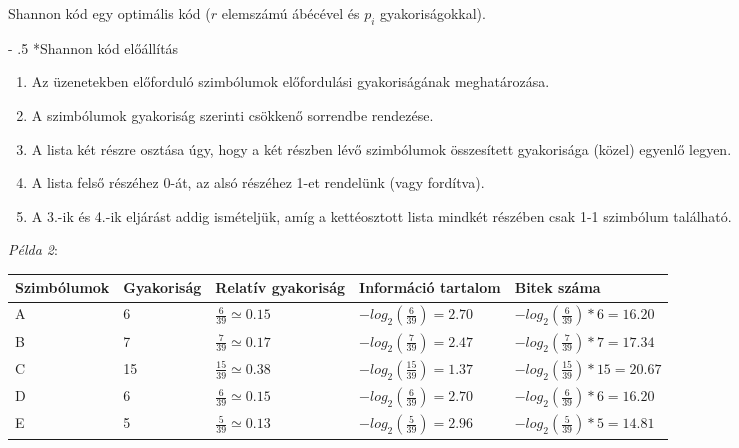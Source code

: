\documentclass[12pt,margin=0px]{article}
\makeatletter
\newcommand\ddfrac[2]{\frac{\displaystyle #1}{\displaystyle #2}}
\renewcommand\paragraph{%
	\@startsection{paragraph}{4}{0mm}%
	{-\baselineskip}%
	{.5\baselineskip}%
	{\normalfont\normalsize\bfseries}}
\makeatother
\begin{document}
    Shannon kód egy optimális kód ($r$ elemszámú ábécével és $p_i$ gyakoriságokkal).

    \paragraph*{Shannon kód előállítás}

    \begin{enumerate}
      \item Az üzenetekben előforduló szimbólumok előfordulási gyakoriságának meghatározása.
      \item A szimbólumok gyakoriság szerinti csökkenő sorrendbe rendezése.
      \item A lista két részre osztása úgy, hogy a két részben lévő szimbólumok összesített gyakorisága (közel) egyenlő legyen.
      \item A lista felső részéhez 0-át, az alsó részéhez 1-et rendelünk (vagy fordítva).
      \item A 3.-ik és 4.-ik eljárást addig ismételjük, amíg a kettéosztott lista mindkét részében csak 1-1 szimbólum található.\\
    \end{enumerate}

    \noindent \emph{Példa 2}:\\

    \renewcommand{\arraystretch}{1.4}
    {\footnotesize
        \noindent \begin{tabular}{|l|l|l|l|l|}
        \hline
        \textbf{Szimbólumok} & \textbf{Gyakoriság} & \textbf{Relatív gyakoriság} & \textbf{Információ tartalom} & \textbf{Bitek száma} \\ \hline
        A       & 6      & $\ddfrac{6}{39} \simeq 0.15$ & $-log_{2}(\ddfrac{6}{39}) = 2.70$  & $-log_2(\ddfrac{6}{39}) * 6 = 16.20$ \\ \hline
        B       & 7      & $\ddfrac{7}{39} \simeq 0.17$ & $-log_{2}(\ddfrac{7}{39}) = 2.47$  & $-log_2(\ddfrac{7}{39}) * 7 = 17.34$ \\ \hline
        C       & 15     & $\ddfrac{15}{39} \simeq 0.38$ & $-log_{2}(\ddfrac{15}{39}) = 1.37$ & $-log_2(\ddfrac{15}{39}) * 15 = 20.67$ \\ \hline
        D       & 6      & $\ddfrac{6}{39} \simeq 0.15$ & $-log_{2}(\ddfrac{6}{39}) = 2.70$  & $-log_2(\ddfrac{6}{39}) * 6 = 16.20$ \\ \hline
        E       & 5      & $\ddfrac{5}{39} \simeq 0.13$ & $-log_{2}(\ddfrac{5}{39}) = 2.96$  & $-log_2(\ddfrac{5}{39}) * 5 = 14.81$ \\ \hline
        \end{tabular}
    }\\\\
    \renewcommand{\arraystretch}{1}
\end{document}

